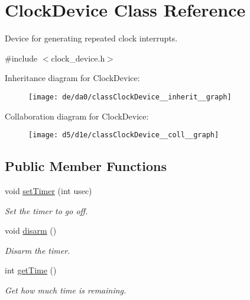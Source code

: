 \hypertarget{classClockDevice}{\section{\-Clock\-Device \-Class \-Reference}
\label{dc/d14/classClockDevice}
}


\-Device for generating repeated clock interrupts.  




{\ttfamily \#include $<$clock\-\_\-device.\-h$>$}



\-Inheritance diagram for \-Clock\-Device\-:\nopagebreak
\begin{figure}[H]
\begin{center}
\leavevmode
\texttt{[image: de/da0/classClockDevice\_\_inherit\_\_graph]}
\end{center}
\end{figure}


\-Collaboration diagram for \-Clock\-Device\-:\nopagebreak
\begin{figure}[H]
\begin{center}
\leavevmode
\texttt{[image: d5/d1e/classClockDevice\_\_coll\_\_graph]}
\end{center}
\end{figure}
\subsection*{\-Public \-Member \-Functions}
\begin{DoxyCompactItemize}
\item 
void \hyperlink{classClockDevice_a780eebde86fb6a6400894128ac37fa37}{set\-Timer} (int usec)
\begin{DoxyCompactList}\small\item\em \-Set the timer to go off. \end{DoxyCompactList}\item 
void \hyperlink{classClockDevice_a0a0c99ba88b7d0cfaccd09d774c726fe}{disarm} ()
\begin{DoxyCompactList}\small\item\em \-Disarm the timer. \end{DoxyCompactList}\item 
int \hyperlink{classClockDevice_a6dd7b50cf793e37514890eff3e7adf95}{get\-Time} ()
\begin{DoxyCompactList}\small\item\em \-Get how much time is remaining. \end{DoxyCompactList}\end{DoxyCompactItemize}


